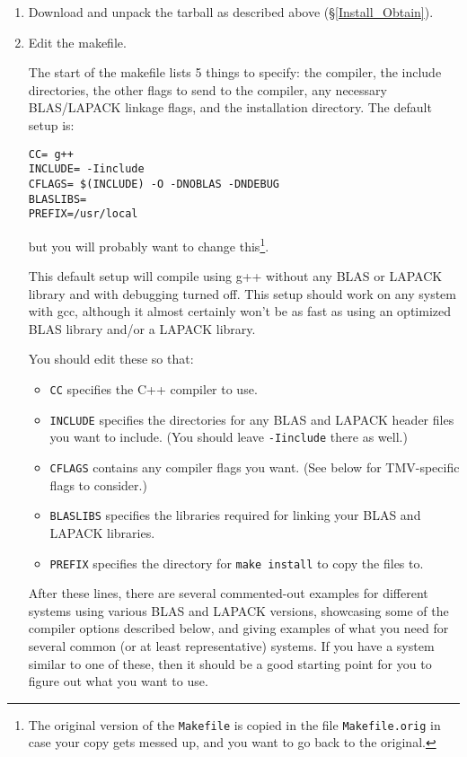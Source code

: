 \documentclass[twoside,letterpaper,11pt]{article}
\renewcommand{\tt}[1]{{\lstinline {#1}}}
\begin{document}
\begin{enumerate}
\item Download and unpack the tarball as described above (\S\ref{Install_Obtain}).

\item
Edit the makefile.

The start of the makefile lists 5 things to specify: the compiler,
the include directories, the other flags to send to the compiler, 
any necessary BLAS/LAPACK linkage flags, and the installation directory.
The default setup is:
\begin{verbatim}
CC= g++
INCLUDE= -Iinclude
CFLAGS= $(INCLUDE) -O -DNOBLAS -DNDEBUG
BLASLIBS=
PREFIX=/usr/local
\end{verbatim}
but you will probably want to change this\footnote{
The original version of the \texttt{Makefile}
is copied in the file \texttt{Makefile.orig} in case your copy gets messed up, and you want to 
go back to the original.}.

This default setup will compile using g++ without any BLAS or LAPACK library and 
with debugging turned off. 
This setup should work on any system with gcc, although it almost certainly 
won't be as fast as using an optimized BLAS library and/or a LAPACK library.

You should edit these so that:
\begin{itemize}
\item \texttt{CC} specifies the C++ compiler to use.
\item \texttt{INCLUDE} specifies the directories for any BLAS and LAPACK header
files you want to include. (You should leave \tt{-Iinclude} there as well.)
\item \texttt{CFLAGS} contains any compiler flags you want.
(See below for TMV-specific flags to consider.)
\item \texttt{BLASLIBS} specifies the libraries required for linking your BLAS and LAPACK libraries.
\item \texttt{PREFIX} specifies the directory for \texttt{make install} to copy the files to.
\end{itemize}

After these lines, there are several commented-out examples for different systems 
using various BLAS
and LAPACK versions, showcasing some of the compiler options described below,
and giving examples of what you need for several common (or at least representative) systems.
If you have a system similar to one of these, then it should be a good 
starting point for you to figure out what you want to use.


\end{enumerate}
\end{document}
